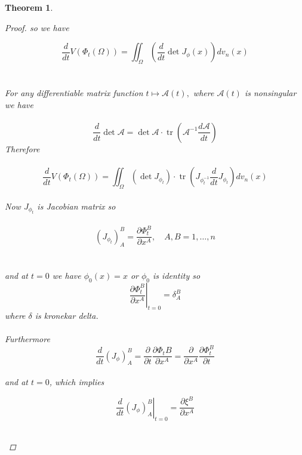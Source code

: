 \documentclass[oneside]{book}
\newtheorem{theorem}{Theorem}[section]
\begin{document}
\begin{theorem}
\begin{proof}
so we have 

 \begin{equation} 
  \label{eq25}
\frac{d}{d t} V\left(\Phi_{t}(\Omega)\right)=\iint_{\Omega}\left(\frac{d}{d t} \operatorname{det} J_{\phi}(x)\right) d v_{n}(x)
\end{equation}
\\\\
For any differentiable
matrix function $t \mapsto \mathcal{A}(t),$ where $\mathcal{A}(t)$ is nonsingular we have \\\\
\begin{equation}
 \label{eq26}
\frac{d}{d t} \operatorname{det} \mathcal{A}=\operatorname{det} \mathcal{A} \cdot \operatorname{tr}\left(\mathcal{A}^{-1} \frac{d \mathcal{A}}{d t}\right)
\end{equation}
Therefore \\\\
$$\frac{d}{d t} V\left(\Phi_{t}(\Omega)\right)=\iint_{\Omega}\left(\operatorname{det} J_{\phi_{t}}\right) \cdot \operatorname{tr}\left(J_{\phi_{t}^{-1}}\frac{d}{d t} J_{\phi_{t}}\right) d v_{n}(x)$$
\\
Now  $J_{\phi_{t}}$ is Jacobian matrix so \\\\
\begin{equation}
 \label{eq27}
\left(J_{\phi_{t}}\right)_{A}^{B}=\frac{\partial \Phi_{t}^{B}}{\partial x^{A}}, \quad A, B=1, \ldots, n  
\end{equation} 
\\\\
and at $t = 0$ we have $\phi_{0}(x) = x$ or $\phi_{0}$ is identity so 
\\

$$\left.\frac{\partial \Phi_{t}^{B}}{\partial x^{A}}\right|_{t=0}=\delta_{A}^{B}$$ where $\delta$ is kronekar delta.\\\\ 
Furthermore \\
    $$\frac{d}{d t}\left(J_{\phi}\right)_{A}^{B}=\frac{\partial}{\partial t} \frac{\partial \Phi_{t} B}{\partial x^{A}}=\frac{\partial}{\partial x^{A}} \frac{\partial \Phi_{t}^{B}}{\partial t}$$ \\


   and at $t=0$, which implies 
   \begin{center}
       $$\left.\frac{d}{d t}\left(J_{\phi}\right)_{A}^{B}\right|_{t=0}=\frac{\partial \xi^{B}}{\partial x^{A}}$$ \\
   \end{center}


\end{proof}
\end{theorem}
\end{document}
